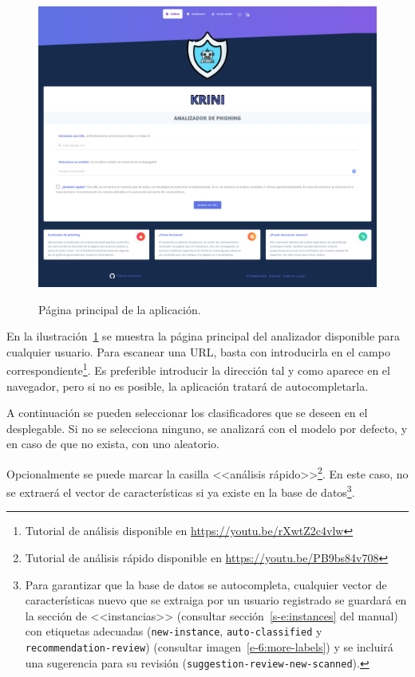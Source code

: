 \begin{figure}[h]
	\caption[Manual de usuario: página principal]{Página principal de la aplicación.}
	\centering
	\includegraphics[width=\textwidth]{../img/anexos/user_guide/1_index}
	\label{e-1:index}
\end{figure}

En la ilustración~\ref{e-1:index} se muestra la página principal del analizador disponible para cualquier usuario. Para escanear una URL, basta con introducirla en el campo correspondiente\footnote{Tutorial de análisis disponible en \url{https://youtu.be/rXwtZ2c4vlw}}. Es preferible introducir la dirección tal y como aparece en el navegador, pero si no es posible, la aplicación tratará de autocompletarla.

A continuación se pueden seleccionar los clasificadores que se deseen en el desplegable. Si no se selecciona ninguno, se analizará con el modelo por defecto, y en caso de que no exista, con uno aleatorio.

Opcionalmente se puede marcar la casilla <<análisis rápido>>\footnote{Tutorial de análisis rápido disponible en \url{https://youtu.be/PB9bs84v708}}. En este caso, no se extraerá el vector de características si ya existe en la base de datos\footnote{Para garantizar que la base de datos se autocompleta, cualquier vector de características nuevo que se extraiga por un usuario registrado se guardará en la sección de <<instancias>> (consultar sección~\ref{s-e:instances} del manual) con etiquetas adecuadas (\texttt{new-instance}, \texttt{auto-classified} y \texttt{recommendation-review}) (consultar imagen~\ref{e-6:more-labels}) y se incluirá una sugerencia para su revisión (\texttt{suggestion-review-new-scanned}).}.
 
